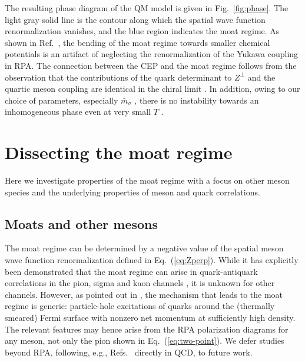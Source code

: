 \documentclass[reprint,english,superscriptaddress,preprintnumbers,amsmath,amssymb,aps,prd]{revtex4-2}
\def\Eq#1{Eq.~(\ref{#1})}
\def\Fig#1{Fig.~\ref{#1}}
\begin{document}
The resulting phase diagram of the QM model is given in \Fig{fig:phase}. The light gray solid line is the contour along which the spatial wave function renormalization vanishes, and the blue region indicates the moat regime. As shown in Ref.\ \cite{Rennecke:2025kub}, the bending of the moat regime towards smaller chemical potentials is an artifact of neglecting the renormalization of the Yukawa coupling in RPA. The connection between the CEP and the moat regime follows from the observation that the contributions of the quark determinant to $Z^\perp$ and the quartic meson coupling are identical in the chiral limit \cite{Nickel:2009ke}. In addition, owing to our choice of parameters, especially $\bar m_\sigma$ \cite{Carignano:2014jla}, there is no instability towards an inhomogeneous phase even at very small $T$ \cite{Rennecke:2025kub}.

\section{Dissecting the moat regime}\label{sec:dissect}
Here we investigate properties of the moat regime with a focus on other meson species and the underlying properties of meson and quark correlations.

\subsection{Moats and other mesons}\label{sec:moremoats}

The moat regime can be determined by a negative value of the spatial meson wave function renormalization defined in \Eq{eq:Zperp}. While it has explicitly been demonstrated that the moat regime can arise in quark-antiquark correlations in the pion, sigma and kaon channels \cite{Fu:2019hdw, Topfel:2024iop, Fu:2024rto, Cao:2025zvh, Rennecke:2025kub}, it is unknown for other channels. However, as pointed out in \cite{Fu:2024rto, Rennecke:2025kub}, the mechanism that leads to the moat regime is generic: particle-hole excitations of quarks around the (thermally smeared) Fermi surface with nonzero net momentum at sufficiently high density. The relevant features may hence arise from the RPA polarization diagrams for any meson, not only the pion shown in \Eq{eq:two-point}. We defer studies beyond RPA, following, e.g.,  Refs.\ \cite{Fu:2019hdw, Fu:2024rto, Pawlowski:2025jpg} directly in QCD, to future work.
\end{document}
